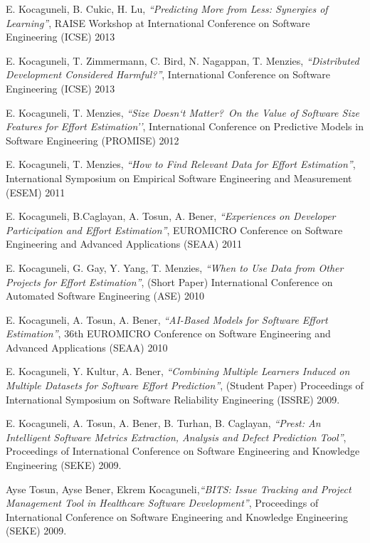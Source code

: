 \documentclass[margin]{res}
\begin{document}
\begin{resume}
\begin{list}{}{\leftmargin=0.5em}
\item E. Kocaguneli, B. Cukic, H. Lu, \textit{``Predicting More from Less: Synergies of Learning''}, RAISE Workshop at International Conference on Software Engineering (ICSE) 2013
\item E. Kocaguneli, T. Zimmermann, C. Bird, N. Nagappan, T. Menzies, \textit{``Distributed Development Considered Harmful?''}, International Conference on Software Engineering (ICSE) 2013
\item E. Kocaguneli, T. Menzies, \textit{``Size Doesn`t Matter?~On the Value of Software Size Features for Effort Estimation''}, International Conference on Predictive Models in Software Engineering (PROMISE) 2012
\item E. Kocaguneli, T. Menzies, \textit{``How to Find Relevant Data for Effort Estimation''}, International Symposium on Empirical Software Engineering and Measurement (ESEM) 2011
\item E. Kocaguneli, B.Caglayan, A. Tosun, A. Bener, \textit{``Experiences on Developer Participation and Effort Estimation''}, EUROMICRO Conference on Software Engineering and Advanced Applications (SEAA) 2011
\item E. Kocaguneli, G. Gay, Y. Yang, T. Menzies, \textit{``When to Use Data from Other Projects for Effort Estimation''}, (Short Paper) International Conference on Automated Software Engineering (ASE) 2010
\item E. Kocaguneli, A. Tosun, A. Bener, \textit{``AI-Based Models for Software Effort Estimation''}, 36th EUROMICRO Conference on Software Engineering and Advanced Applications (SEAA) 2010
\item E. Kocaguneli, Y. Kultur, A. Bener, \textit{``Combining Multiple Learners Induced on Multiple Datasets for Software Effort Prediction''}, (Student Paper) Proceedings of International Symposium on Software Reliability Engineering (ISSRE) 2009.
\item E. Kocaguneli, A. Tosun, A. Bener, B. Turhan, B. Caglayan, \textit{``Prest: An Intelligent Software Metrics Extraction, Analysis and Defect Prediction Tool''}, Proceedings of International Conference on Software Engineering and Knowledge Engineering (SEKE) 2009.
\item Ayse Tosun, Ayse Bener, Ekrem Kocaguneli,\textit{``BITS: Issue Tracking and Project Management Tool in Healthcare Software Development''}, Proceedings of International Conference on Software Engineering and Knowledge Engineering (SEKE) 2009.

\end{list}
\end{resume}
\end{document}
